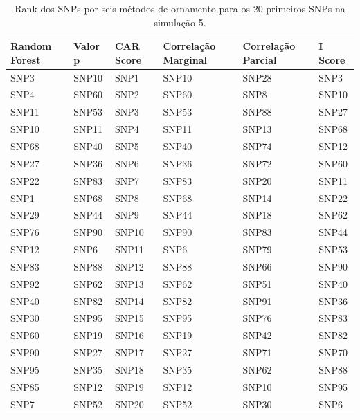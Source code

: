 \begin{table}[ht]
\centering
\begin{tabular}{llllll}
  \hline
Random Forest & Valor p & CAR Score & Correlação Marginal & Correlação Parcial & I Score \\ 
  \hline
SNP3 & SNP10 & SNP1 & SNP10 & SNP28 & SNP3 \\ 
  SNP4 & SNP60 & SNP2 & SNP60 & SNP8 & SNP10 \\ 
  SNP11 & SNP53 & SNP3 & SNP53 & SNP88 & SNP27 \\ 
  SNP10 & SNP11 & SNP4 & SNP11 & SNP13 & SNP68 \\ 
  SNP68 & SNP40 & SNP5 & SNP40 & SNP74 & SNP12 \\ 
  SNP27 & SNP36 & SNP6 & SNP36 & SNP72 & SNP60 \\ 
  SNP22 & SNP83 & SNP7 & SNP83 & SNP20 & SNP11 \\ 
  SNP1 & SNP68 & SNP8 & SNP68 & SNP14 & SNP22 \\ 
  SNP29 & SNP44 & SNP9 & SNP44 & SNP18 & SNP62 \\ 
  SNP76 & SNP90 & SNP10 & SNP90 & SNP83 & SNP44 \\ 
  SNP12 & SNP6 & SNP11 & SNP6 & SNP79 & SNP53 \\ 
  SNP83 & SNP88 & SNP12 & SNP88 & SNP66 & SNP90 \\ 
  SNP92 & SNP62 & SNP13 & SNP62 & SNP51 & SNP40 \\ 
  SNP40 & SNP82 & SNP14 & SNP82 & SNP91 & SNP36 \\ 
  SNP30 & SNP95 & SNP15 & SNP95 & SNP76 & SNP83 \\ 
  SNP60 & SNP19 & SNP16 & SNP19 & SNP42 & SNP82 \\ 
  SNP90 & SNP27 & SNP17 & SNP27 & SNP71 & SNP70 \\ 
  SNP95 & SNP35 & SNP18 & SNP35 & SNP62 & SNP88 \\ 
  SNP85 & SNP12 & SNP19 & SNP12 & SNP10 & SNP95 \\ 
  SNP7 & SNP52 & SNP20 & SNP52 & SNP30 & SNP6 \\ 
   \hline
\end{tabular}
\caption{Rank dos SNPs por seis métodos de ornamento para os 20 primeiros SNPs na simulação 5.} 
\label{tab:ranks}
\end{table}
